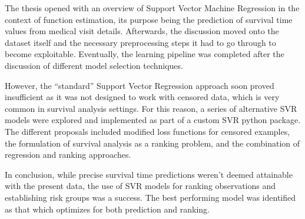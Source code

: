 \documentclass[12pt]{report}
\begin{document}
The thesis opened with an overview of Support Vector Machine Regression in the context of function estimation, its purpose being the prediction of survival time values from medical visit details. Afterwards, the discussion moved onto the dataset itself and the necessary preprocessing steps it had to go through to become exploitable. Eventually, the learning pipeline was completed after the discussion of different model selection techniques.

However, the ``standard'' Support Vector Regression approach soon proved insufficient as it was not designed to work with censored data, which is very common in survival analysis settings. For this reason, a series of alternative SVR models were explored and implemented as part of a custom SVR python package. The different proposals included modified loss functions for censored examples, the formulation of survival analysis as a ranking problem, and the combination of regression and ranking approaches.

In conclusion, while precise survival time predictions weren't deemed attainable with the present data, the use of SVR models for ranking observations and establishing risk groups was a success. The best performing model was identified as that which optimizes for both prediction and ranking.

%
%
 

% 
\end{document}
